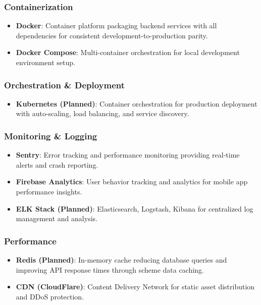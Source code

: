 \subsubsection{Containerization}
\begin{itemize}
    \item \textbf{Docker}: Container platform packaging backend services with all dependencies for consistent development-to-production parity.
    \item \textbf{Docker Compose}: Multi-container orchestration for local development environment setup.
\end{itemize}

\subsubsection{Orchestration \& Deployment}
\begin{itemize}
    \item \textbf{Kubernetes (Planned)}: Container orchestration for production deployment with auto-scaling, load balancing, and service discovery.
\end{itemize}

\subsubsection{Monitoring \& Logging}
\begin{itemize}
    \item \textbf{Sentry}: Error tracking and performance monitoring providing real-time alerts and crash reporting.
    \item \textbf{Firebase Analytics}: User behavior tracking and analytics for mobile app performance insights.
    \item \textbf{ELK Stack (Planned)}: Elasticsearch, Logstash, Kibana for centralized log management and analysis.
\end{itemize}

\subsubsection{Performance}
\begin{itemize}
    \item \textbf{Redis (Planned)}: In-memory cache reducing database queries and improving API response times through scheme data caching.
    \item \textbf{CDN (CloudFlare)}: Content Delivery Network for static asset distribution and DDoS protection.
\end{itemize}

